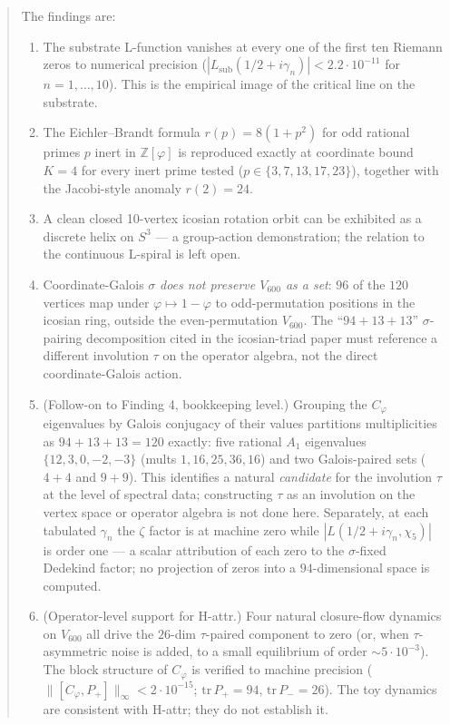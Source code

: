 \documentclass[11pt,a4paper]{article}
\newcommand{\Vsix}{V_{600}}
\newcommand{\Cphi}{C_\varphi}
\newcommand{\Z}{\mathbb{Z}}
\begin{document}
\begin{abstract}
The findings are:
\begin{enumerate}[leftmargin=*]
  \item The substrate L-function vanishes at every one of the first
        ten Riemann zeros to numerical precision
        ($|L_{\mathrm{sub}}(1/2 + i \gamma_n)| < 2.2 \cdot 10^{-11}$ for
        $n = 1, \ldots, 10$). This is the empirical image of the
        critical line on the substrate.
  \item The Eichler--Brandt formula $r(p) = 8 (1 + p^2)$ for odd
        rational primes $p$ inert in $\Z[\varphi]$ is reproduced
        exactly at coordinate bound $K = 4$ for every inert prime
        tested ($p \in \{3, 7, 13, 17, 23\}$), together with the
        Jacobi-style anomaly $r(2) = 24$.
  \item A clean closed 10-vertex icosian rotation orbit can be
        exhibited as a discrete helix on $S^3$ --- a group-action
        demonstration; the relation to the continuous L-spiral is
        left open.
  \item Coordinate-Galois $\sigma$ \emph{does not preserve $\Vsix$
        as a set}: $96$ of the $120$ vertices map under
        $\varphi \mapsto 1 - \varphi$ to odd-permutation positions
        in the icosian ring, outside the even-permutation $\Vsix$.
        The ``$94 + 13 + 13$'' $\sigma$-pairing decomposition cited
        in the icosian-triad paper must reference a different
        involution $\tau$ on the operator algebra, not the direct
        coordinate-Galois action.
  \item (Follow-on to Finding 4, bookkeeping level.) Grouping the
        $\Cphi$ eigenvalues by Galois conjugacy of their values
        partitions multiplicities as $94 + 13 + 13 = 120$ exactly:
        five rational $A_1$ eigenvalues $\{12, 3, 0, -2, -3\}$
        (mults $1, 16, 25, 36, 16$) and two Galois-paired sets
        ($4{+}4$ and $9{+}9$). This identifies a natural
        \emph{candidate} for the involution $\tau$ at the level
        of spectral data; constructing $\tau$ as an involution on
        the vertex space or operator algebra is not done here.
        Separately, at each tabulated $\gamma_n$ the $\zeta$
        factor is at machine zero while $|L(1/2+i\gamma_n,
        \chi_5)|$ is order one --- a scalar attribution of each
        zero to the $\sigma$-fixed Dedekind factor; no projection
        of zeros into a $94$-dimensional space is computed.
  \item (Operator-level support for H-attr.) Four natural
        closure-flow dynamics on $\Vsix$ all drive the $26$-dim
        $\tau$-paired component to zero (or, when $\tau$-asymmetric
        noise is added, to a small equilibrium of order $\sim 5
        \cdot 10^{-3}$). The block structure of $\Cphi$ is
        verified to machine precision
        ($\|[\Cphi, P_+]\|_\infty < 2 \cdot 10^{-15}$;
        $\mathrm{tr}\,P_+ = 94$, $\mathrm{tr}\,P_- = 26$). The
        toy dynamics are consistent with H-attr; they do not
        establish it.
\end{enumerate}


\end{abstract}
\end{document}
